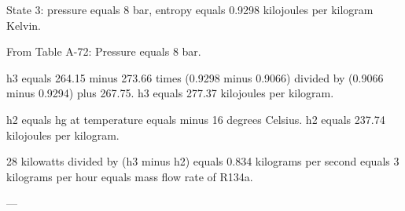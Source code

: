 State 3: pressure equals 8 bar, entropy equals 0.9298 kilojoules per kilogram Kelvin.  

From Table A-72:  
Pressure equals 8 bar.  

h3 equals 264.15 minus 273.66 times (0.9298 minus 0.9066) divided by (0.9066 minus 0.9294) plus 267.75.  
h3 equals 277.37 kilojoules per kilogram.  

h2 equals hg at temperature equals minus 16 degrees Celsius.  
h2 equals 237.74 kilojoules per kilogram.  

28 kilowatts divided by (h3 minus h2) equals 0.834 kilograms per second equals 3 kilograms per hour equals mass flow rate of R134a.  

---